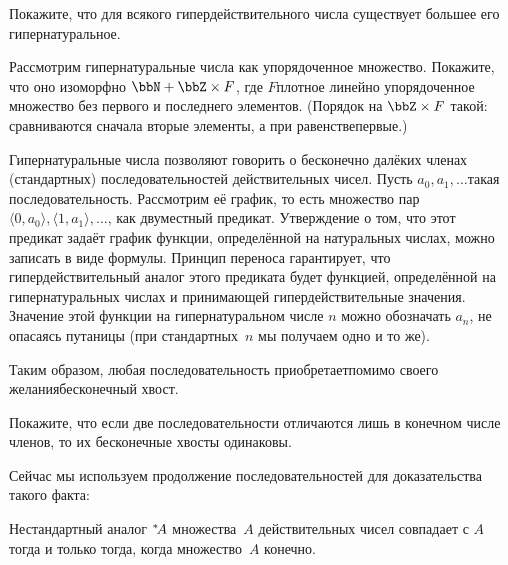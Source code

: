 \begin{problem}
Покажите, что для всякого гипердействительного числа существует
большее его гипернатуральное.
\end{problem}

\begin{problem}
Рассмотрим гипернатуральные числа как упорядоченное мно\-же\-с\-т\-во.
Покажите, что оно изоморфно $\bbN + \bbZ\times F$, где
$F$\т плотное линейно упорядоченное множество без первого
и последнего элементов.%
(Порядок на $\bbZ\times F$ такой: сравниваются
сначала вторые элементы, а при равенстве\т первые.)
\end{problem}

Гипернатуральные числа позволяют говорить о бесконечно далёких
членах (стандартных) последовательностей действительных чисел.
Пусть $a_0,a_1,\dots$\т такая последовательность. Рассмотрим её
график, то есть множество пар $\langle 0,a_0\rangle,\langle
1,a_1\rangle,\dots$, как двуместный предикат. Утверждение о том,
что этот предикат задаёт график функции, определённой на
натуральных числах, можно записать в виде формулы. Принцип
переноса гарантирует, что гипердействительный аналог этого
предиката будет функцией, определённой на гипернатуральных
числах и принимающей гипердействительные значения. Значение этой
функции на гипернатуральном числе $n$ можно обозначать $a_n$, не
опасаясь путаницы (при стандартных~$n$ мы получаем одно и то
же).

Таким образом, любая последовательность приобретает\т помимо
своего желания\т бесконечный  хвост.

\begin{problem}
Покажите, что если две последовательности отличаются лишь
в конечном числе членов, то их бесконечные хвосты одинаковы.
\end{problem}

Сейчас мы используем продолжение последовательностей для
доказательства такого факта:

\begin{theorem}
Нестандартный аналог ${}^*\!A$ множества~$A$ действительных чисел совпадает
с $A$ тогда и только тогда, когда множество~$A$ конечно.
\end{theorem}

